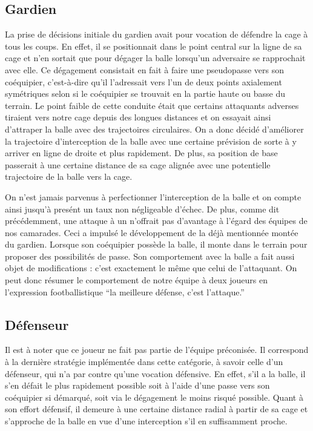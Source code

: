 \documentclass[12pt,a4paper]{article}
\begin{document}
\subsection*{Gardien}
La prise de d\'ecisions initiale du gardien avait pour vocation de d\'efendre 
la cage \`a tous les coups. En effet, il se positionnait dans le point central 
sur la ligne de sa cage et n'en sortait que pour d\'egager la balle lorsqu'un 
adversaire se rapprochait avec elle. 
Ce d\'egagement consistait en fait \`a faire une pseudopasse vers son 
co\'equipier, c'est-\`a-dire qu'il l'adressait vers l'un de deux points 
axialement sym\'etriques selon si le co\'equipier se trouvait en la partie haute 
ou basse du terrain. 
Le point faible de cette conduite \'etait que certains attaquants adverses 
tiraient vers notre cage depuis des longues distances et on essayait ainsi 
d'attraper la balle avec des trajectoires circulaires. On a donc d\'ecid\'e 
d'am\'eliorer la trajectoire d'interception de la balle avec une certaine 
pr\'evision de sorte \`a y arriver en ligne de droite et plus rapidement. De 
plus, sa position de base passerait \`a une certaine distance de sa cage 
align\'ee avec une potentielle trajectoire de la balle vers la cage.

On n'est jamais parvenus \`a perfectionner l'interception de la balle et on 
compte ainsi jusqu'\`a pres\'ent un taux non n\'egligeable d'\'echec. De plus, 
comme dit pr\'ec\'edemment, une attaque \`a un n'offrait pas d'avantage \`a 
l'\'egard des \'equipes de nos camarades. Ceci a impuls\'e le 
d\'eveloppement de la d\'ej\`a mentionn\'ee mont\'ee du gardien. Lorsque son 
co\'equipier poss\`ede la balle, il monte dans le terrain pour proposer des 
possibilit\'es de passe. Son comportement avec la balle a fait aussi objet de 
modifications : c'est exactement le m\^eme que celui de l'attaquant.
On peut donc r\'esumer le comportement de notre \'equipe \`a deux joueurs en 
l'expression footballistique \enquote{la meilleure d\'efense, c'est l'attaque.}

\subsection*{D\'efenseur}
Il est \`a noter que ce joueur ne fait pas partie de l'\'equipe pr\'econis\'ee.
Il correspond \`a la derni\`ere strat\'egie impl\'ement\'ee dans cette 
cat\'egorie, \`a savoir celle d'un d\'efenseur, qui n'a par contre qu'une 
vocation d\'efensive. 
En effet, s'il a la balle, il s'en d\'efait le plus rapidement possible soit \`a 
l'aide d'une passe vers son co\'equipier si d\'emarqu\'e, soit via le 
d\'egagement le moins risqu\'e possible. 
Quant \`a son effort d\'efensif, il demeure \`a une certaine distance radial \`a 
partir de sa cage et s'approche de la balle en vue d'une interception s'il en 
suffisamment proche.
\end{document}
